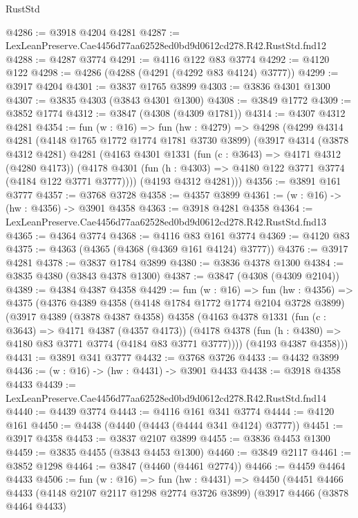 \begin{lexlean}{RustStd}
\begin{coremodule}
@4286 := @3918 @4204 @4281
@4287 := LexLeanPreserve.Cae4456d77aa62528ed0bd9d0612cd278.R42.RustStd.fnd12
@4288 := @4287 @3774
@4291 := @4116 @122 @83 @3774
@4292 := @4120 @122
@4298 := @4286 (@4288 (@4291 (@4292 @83 @4124) @3777))
@4299 := @3917 @4204
@4301 := @3837 @1765 @3899
@4303 := @3836 @4301 @1300
@4307 := @3835 @4303 (@3843 @4301 @1300)
@4308 := @3849 @1772
@4309 := @3852 @1774
@4312 := @3847 (@4308 (@4309 @1781))
@4314 := @4307 @4312 @4281
@4354 := fun (w : @16) =>
  fun (hw : @4279) =>
  @4298
    (@4299
      @4314
      @4281
      (@4148 @1765 @1772 @1774 @1781 @3730 @3899)
      (@3917
        @4314
        (@3878 @4312 @4281)
        @4281
        (@4163
          @4301
          @1331
          (fun (c : @3643) => @4171 @4312 (@4280 @4173))
          (@4178 @4301 (fun (h : @4303) => @4180 @122 @3771 @3774 (@4184 @122 @3771 @3777))))
        (@4193 @4312 @4281)))
@4356 := @3891 @161 @3777
@4357 := @3768 @3728
@4358 := @4357 @3899
@4361 := (w : @16) -> (hw : @4356) -> @3901 @4358
@4363 := @3918 @4281 @4358
@4364 := LexLeanPreserve.Cae4456d77aa62528ed0bd9d0612cd278.R42.RustStd.fnd13
@4365 := @4364 @3774
@4368 := @4116 @83 @161 @3774
@4369 := @4120 @83
@4375 := @4363 (@4365 (@4368 (@4369 @161 @4124) @3777))
@4376 := @3917 @4281
@4378 := @3837 @1784 @3899
@4380 := @3836 @4378 @1300
@4384 := @3835 @4380 (@3843 @4378 @1300)
@4387 := @3847 (@4308 (@4309 @2104))
@4389 := @4384 @4387 @4358
@4429 := fun (w : @16) =>
  fun (hw : @4356) =>
  @4375
    (@4376
      @4389
      @4358
      (@4148 @1784 @1772 @1774 @2104 @3728 @3899)
      (@3917
        @4389
        (@3878 @4387 @4358)
        @4358
        (@4163
          @4378
          @1331
          (fun (c : @3643) => @4171 @4387 (@4357 @4173))
          (@4178 @4378 (fun (h : @4380) => @4180 @83 @3771 @3774 (@4184 @83 @3771 @3777))))
        (@4193 @4387 @4358)))
@4431 := @3891 @341 @3777
@4432 := @3768 @3726
@4433 := @4432 @3899
@4436 := (w : @16) -> (hw : @4431) -> @3901 @4433
@4438 := @3918 @4358 @4433
@4439 := LexLeanPreserve.Cae4456d77aa62528ed0bd9d0612cd278.R42.RustStd.fnd14
@4440 := @4439 @3774
@4443 := @4116 @161 @341 @3774
@4444 := @4120 @161
@4450 := @4438 (@4440 (@4443 (@4444 @341 @4124) @3777))
@4451 := @3917 @4358
@4453 := @3837 @2107 @3899
@4455 := @3836 @4453 @1300
@4459 := @3835 @4455 (@3843 @4453 @1300)
@4460 := @3849 @2117
@4461 := @3852 @1298
@4464 := @3847 (@4460 (@4461 @2774))
@4466 := @4459 @4464 @4433
@4506 := fun (w : @16) =>
  fun (hw : @4431) =>
  @4450
    (@4451
      @4466
      @4433
      (@4148 @2107 @2117 @1298 @2774 @3726 @3899)
      (@3917
        @4466
        (@3878 @4464 @4433)

\end{coremodule}
\end{lexlean}
